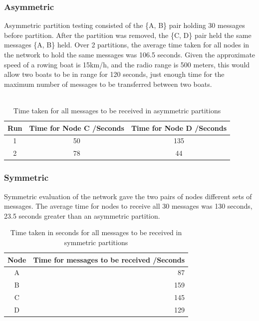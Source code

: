 \documentclass[12pt,a4paper]{report}
\begin{document}
\subsubsection{Asymmetric}
Asymmetric partition testing consisted of the \{A, B\} pair holding 30 messages before partition. After the partition was removed, the \{C, D\} pair held the same messages \{A, B\} held. Over 2 partitions, the average time taken for all nodes in the network to hold the same messages was 106.5 seconds. Given the approximate speed of a rowing boat is 15km/h, and the radio range is 500 meters, this would allow two boats to be in range for 120 seconds, just enough time for the maximum number of messages to be transferred between two boats.  \\ \\
\begin{table}[h]
\begin{center}
\begin{tabular}{ |c|c|c| } 
\hline
Run & Time for Node C /Seconds & Time for Node D /Seconds \\ 
\hline
1 & 50 & 135 \\ 
\hline
2 & 78 & 44  \\ 
\hline
\end{tabular}
\end{center}
\caption{Time taken for all messages to be received in asymmetric partitions}
\end{table}  
\FloatBarrier 

\subsubsection{Symmetric}
Symmetric evaluation of the network gave the two pairs of nodes different sets of messages.
The average time for nodes to receive all 30 messages was 130 seconds, 23.5 seconds greater than an asymmetric partition.
\begin{table}
\begin{center}
\begin{tabular}{ |c|r| } 
\hline
Node & Time for messages to be received /Seconds\\ 
\hline
A & 87 \\
\hline
B & 159 \\
\hline
C & 145 \\
\hline
D & 129 \\ 
\hline
\end{tabular}
\end{center}
\caption{Time taken in seconds for all messages to be received in symmetric partitions}
\end{table}  
\FloatBarrier
\end{document}
